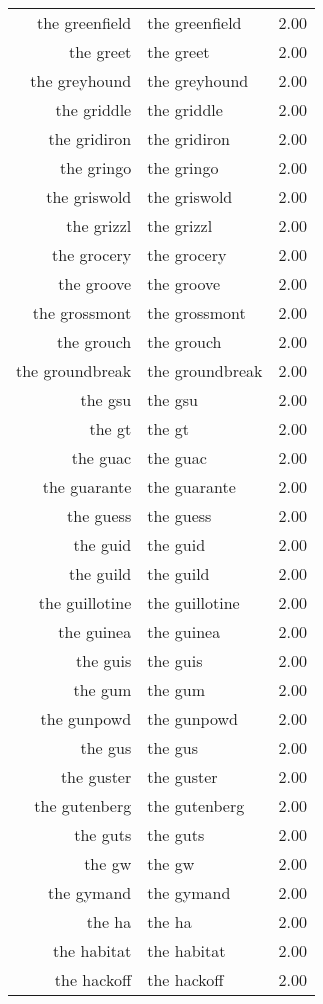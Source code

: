 \begin{table}[ht]
\begin{tabular}{rlr}
  the greenfield & the greenfield & 2.00 \\ 
  the greet & the greet & 2.00 \\ 
  the greyhound & the greyhound & 2.00 \\ 
  the griddle & the griddle & 2.00 \\ 
  the gridiron & the gridiron & 2.00 \\ 
  the gringo & the gringo & 2.00 \\ 
  the griswold & the griswold & 2.00 \\ 
  the grizzl & the grizzl & 2.00 \\ 
  the grocery & the grocery & 2.00 \\ 
  the groove & the groove & 2.00 \\ 
  the grossmont & the grossmont & 2.00 \\ 
  the grouch & the grouch & 2.00 \\ 
  the groundbreak & the groundbreak & 2.00 \\ 
  the gsu & the gsu & 2.00 \\ 
  the gt & the gt & 2.00 \\ 
  the guac & the guac & 2.00 \\ 
  the guarante & the guarante & 2.00 \\ 
  the guess & the guess & 2.00 \\ 
  the guid & the guid & 2.00 \\ 
  the guild & the guild & 2.00 \\ 
  the guillotine & the guillotine & 2.00 \\ 
  the guinea & the guinea & 2.00 \\ 
  the guis & the guis & 2.00 \\ 
  the gum & the gum & 2.00 \\ 
  the gunpowd & the gunpowd & 2.00 \\ 
  the gus & the gus & 2.00 \\ 
  the guster & the guster & 2.00 \\ 
  the gutenberg & the gutenberg & 2.00 \\ 
  the guts & the guts & 2.00 \\ 
  the gw & the gw & 2.00 \\ 
  the gymand & the gymand & 2.00 \\ 
  the ha & the ha & 2.00 \\ 
  the habitat & the habitat & 2.00 \\ 
  the hackoff & the hackoff & 2.00 \\ 

\end{tabular}
\end{table}
